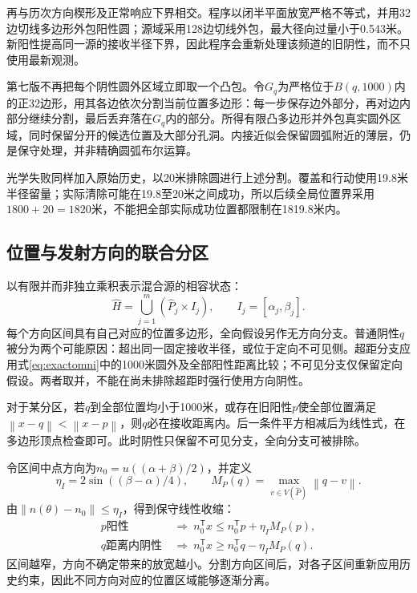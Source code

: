 \documentclass[UTF8,a4paper,zihao=-4,fontset=windows]{ctexart}
\newcommand{\norm}[1]{\left\lVert#1\right\rVert}
\begin{document}
再与历次方向楔形及正常响应下界相交。程序以闭半平面放宽严格不等式，并用32边切线多边形外包阳性圆；源域采用128边切线外包，最大径向过量小于0.543米。新阳性提高同一源的接收半径下界，因此程序会重新处理该频道的旧阴性，而不只使用最新观测。

第七版不再把每个阴性圆外区域立即取一个凸包。令$G_q$为严格位于$B(q,1000)$内的正32边形，用其各边依次分割当前位置多边形：每一步保存边外部分，再对边内部分继续分割，最后丢弃落在$G_q$内的部分。所得有限凸多边形并外包真实圆外区域，同时保留分开的候选位置及大部分孔洞。内接近似会保留圆弧附近的薄层，仍是保守处理，并非精确圆弧布尔运算。

光学失败同样加入原始历史，以20米排除圆进行上述分割。覆盖和行动使用19.8米半径留量；实际清除可能在19.8至20米之间成功，所以后续全局位置界采用$1800+20=1820$米，不能把全部实际成功位置都限制在1819.8米内。

\subsection{位置与发射方向的联合分区}
以有限并而非独立乘积表示混合源的相容状态：
\begin{equation}\label{eq:jointposterior}
\widehat H=\bigcup_{j=1}^{m}\left(\widehat P_j\times I_j\right),
\qquad I_j=[\alpha_j,\beta_j].
\end{equation}
每个方向区间具有自己对应的位置多边形，全向假设另作无方向分支。普通阴性$q$被分为两个可能原因：超出同一固定接收半径，或位于定向不可见侧。超距分支应用式\eqref{eq:exactomni}中的1000米圆外及全部阳性距离比较；不可见分支仅保留定向假设。两者取并，不能在尚未排除超距时强行使用方向阴性。

对于某分区，若$q$到全部位置均小于1000米，或存在旧阳性$p$使全部位置满足$\norm{x-q}<\norm{x-p}$，则$q$必在接收距离内。后一条件平方相减后为线性式，在多边形顶点检查即可。此时阴性只保留不可见分支，全向分支可被排除。

令区间中点方向为$n_0=u((\alpha+\beta)/2)$，并定义
\begin{equation}
\eta_I=2\sin((\beta-\alpha)/4),\qquad
M_P(q)=\max_{v\in V(\widehat P)}\norm{q-v}.
\end{equation}
由$\norm{n(\theta)-n_0}\le\eta_I$，得到保守线性收缩：
\begin{align}
p\text{阳性}&\ \Longrightarrow\ n_0^\mathsf T x\le n_0^\mathsf T p+\eta_I M_P(p),\\
q\text{距离内阴性}&\ \Longrightarrow\ n_0^\mathsf T x\ge n_0^\mathsf T q-\eta_I M_P(q).
\end{align}
区间越窄，方向不确定带来的放宽越小。分割方向区间后，对各子区间重新应用历史约束，因此不同方向对应的位置区域能够逐渐分离。
\end{document}
